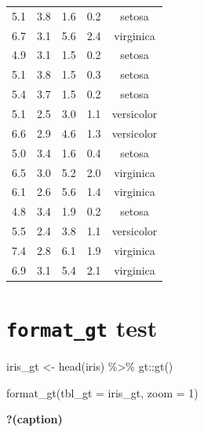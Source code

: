 \documentclass[
]{article}
\newenvironment{Shaded}{\begin{snugshade}}{\end{snugshade}}
\newcommand{\AttributeTok}[1]{\textcolor[rgb]{0.40,0.45,0.13}{#1}}
\newcommand{\DecValTok}[1]{\textcolor[rgb]{0.68,0.00,0.00}{#1}}
\newcommand{\FunctionTok}[1]{\textcolor[rgb]{0.28,0.35,0.67}{#1}}
\newcommand{\NormalTok}[1]{\textcolor[rgb]{0.00,0.23,0.31}{#1}}
\newcommand{\OtherTok}[1]{\textcolor[rgb]{0.00,0.23,0.31}{#1}}
\newcommand{\SpecialCharTok}[1]{\textcolor[rgb]{0.37,0.37,0.37}{#1}}
\begin{document}
\begin{longtable}{rrrrc}
5.1 & 3.8 & 1.6 & 0.2 & setosa \\ 
6.7 & 3.1 & 5.6 & 2.4 & virginica \\ 
4.9 & 3.1 & 1.5 & 0.2 & setosa \\ 
5.1 & 3.8 & 1.5 & 0.3 & setosa \\ 
5.4 & 3.7 & 1.5 & 0.2 & setosa \\ 
5.1 & 2.5 & 3.0 & 1.1 & versicolor \\ 
6.6 & 2.9 & 4.6 & 1.3 & versicolor \\ 
5.0 & 3.4 & 1.6 & 0.4 & setosa \\ 
6.5 & 3.0 & 5.2 & 2.0 & virginica \\ 
6.1 & 2.6 & 5.6 & 1.4 & virginica \\ 
4.8 & 3.4 & 1.9 & 0.2 & setosa \\ 
5.5 & 2.4 & 3.8 & 1.1 & versicolor \\ 
7.4 & 2.8 & 6.1 & 1.9 & virginica \\ 
6.9 & 3.1 & 5.4 & 2.1 & virginica \\ 
\bottomrule
\end{longtable}

\hypertarget{format_gt-test}{%
\section{\texorpdfstring{\texttt{format\_gt}
test}{format\_gt test}}\label{format_gt-test}}

\begin{Shaded}
\begin{Highlighting}[]
\NormalTok{iris\_gt }\OtherTok{\textless{}{-}} \FunctionTok{head}\NormalTok{(iris) }\SpecialCharTok{\%\textgreater{}\%} 
\NormalTok{  gt}\SpecialCharTok{::}\FunctionTok{gt}\NormalTok{()}

\FunctionTok{format\_gt}\NormalTok{(}\AttributeTok{tbl\_gt =}\NormalTok{ iris\_gt, }\AttributeTok{zoom =} \DecValTok{1}\NormalTok{)}
\end{Highlighting}
\end{Shaded}

\begin{table}

\caption{\textbf{?(caption)}}\begin{minipage}[t]{\linewidth}

{\centering 


}

\end{minipage}%

\end{table}
\end{document}
